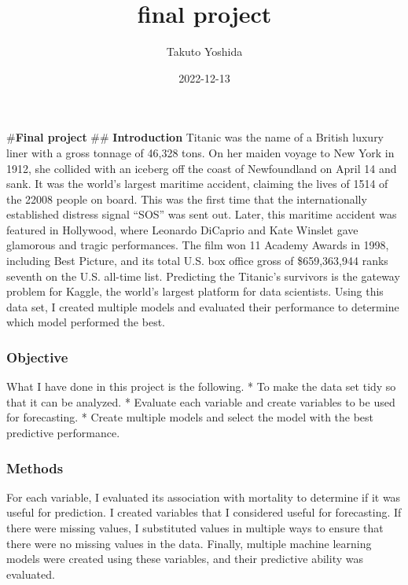 \documentclass[
]{article}
\title{final project}
\author{Takuto Yoshida}
\date{2022-12-13}
\begin{document}
\maketitle

\#\textbf{Final project} \#\# \textbf{Introduction} Titanic was the name
of a British luxury liner with a gross tonnage of 46,328 tons. On her
maiden voyage to New York in 1912, she collided with an iceberg off the
coast of Newfoundland on April 14 and sank. It was the world's largest
maritime accident, claiming the lives of 1514 of the 22008 people on
board. This was the first time that the internationally established
distress signal ``SOS'' was sent out. Later, this maritime accident was
featured in Hollywood, where Leonardo DiCaprio and Kate Winslet gave
glamorous and tragic performances. The film won 11 Academy Awards in
1998, including Best Picture, and its total U.S. box office gross of
\$659,363,944 ranks seventh on the U.S. all-time list. Predicting the
Titanic's survivors is the gateway problem for Kaggle, the world's
largest platform for data scientists. Using this data set, I created
multiple models and evaluated their performance to determine which model
performed the best.

\hypertarget{objective}{%
\subsubsection{\texorpdfstring{\textbf{Objective}}{Objective}}\label{objective}}

What I have done in this project is the following. * To make the data
set tidy so that it can be analyzed. * Evaluate each variable and create
variables to be used for forecasting. * Create multiple models and
select the model with the best predictive performance.

\hypertarget{methods}{%
\subsubsection{\texorpdfstring{\textbf{Methods}}{Methods}}\label{methods}}

For each variable, I evaluated its association with mortality to
determine if it was useful for prediction. I created variables that I
considered useful for forecasting. If there were missing values, I
substituted values in multiple ways to ensure that there were no missing
values in the data. Finally, multiple machine learning models were
created using these variables, and their predictive ability was
evaluated.
\end{document}
